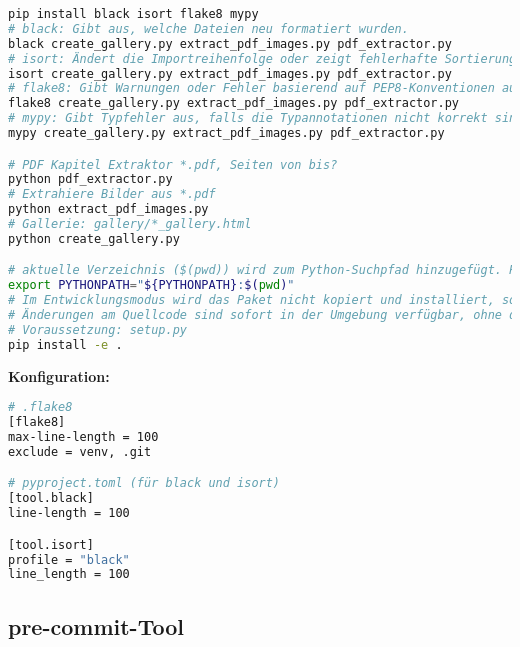 \documentclass{vorlage-design-main}
\begin{document}
\begin{lstlisting}[language=bash]
pip install black isort flake8 mypy
# black: Gibt aus, welche Dateien neu formatiert wurden.
black create_gallery.py extract_pdf_images.py pdf_extractor.py
# isort: Ändert die Importreihenfolge oder zeigt fehlerhafte Sortierungen an.
isort create_gallery.py extract_pdf_images.py pdf_extractor.py
# flake8: Gibt Warnungen oder Fehler basierend auf PEP8-Konventionen aus
flake8 create_gallery.py extract_pdf_images.py pdf_extractor.py
# mypy: Gibt Typfehler aus, falls die Typannotationen nicht korrekt sind.
mypy create_gallery.py extract_pdf_images.py pdf_extractor.py

# PDF Kapitel Extraktor *.pdf, Seiten von bis?
python pdf_extractor.py
# Extrahiere Bilder aus *.pdf
python extract_pdf_images.py
# Gallerie: gallery/*_gallery.html
python create_gallery.py

# aktuelle Verzeichnis ($(pwd)) wird zum Python-Suchpfad hinzugefügt. Python Module und Pakete, die sich in diesem Verzeichnis befinden, erkennt und importieren kann.
export PYTHONPATH="${PYTHONPATH}:$(pwd)"
# Im Entwicklungsmodus wird das Paket nicht kopiert und installiert, sondern als Referenz zur aktuellen Verzeichnisstruktur verlinkt.
# Änderungen am Quellcode sind sofort in der Umgebung verfügbar, ohne dass man das Paket erneut installieren muss.
# Voraussetzung: setup.py
pip install -e .
\end{lstlisting}

\textbf{Konfiguration:}

\begin{lstlisting}[language=bash]
# .flake8
[flake8]
max-line-length = 100
exclude = venv, .git

# pyproject.toml (für black und isort)
[tool.black]
line-length = 100

[tool.isort]
profile = "black"
line_length = 100
\end{lstlisting}

\subsection{pre-commit-Tool}\label{pre-commit-tool}
\end{document}
